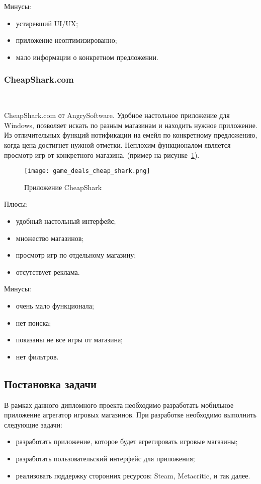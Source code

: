 Минусы:
\begin{itemize}
 \item устаревший UI/UX;
 \item приложение неоптимизированно;
 \item мало информации о конкретном предложении.
\end{itemize}

\subsubsection{CheapShark.com}~\par
CheapShark.com от AngrySoftware. Удобное настольное приложение для Windows, позволяет искать по разным магазинам и находить нужное приложение. Из отличительных функций нотификации на емейл по конкретному предложению, когда цена достигнет нужной отметки. Неплохим функционалом является просмотр игр от конкретного магазина. (пример на рисунке~\ref{fig:domain:game_cheap_shark}).

\begin{figure}[H]
  \centering
    \texttt{[image: game\_deals\_cheap\_shark.png]} 
    \caption{Приложение CheapShark}
    \label{fig:domain:game_cheap_shark}
 \end{figure}

Плюсы:
\begin{itemize}
  \item удобный настольный интерфейс;
  \item множество магазинов;
  \item просмотр игр по отдельному магазину;
  \item отсутствует реклама.
\end{itemize}

 Минусы:
 \begin{itemize}
  \item очень мало функционала;
  \item нет поиска;
  \item показаны не все игры от магазина;
  \item нет фильтров.
\end{itemize}
 
\subsection{Постановка задачи}
В рамках данного дипломного проекта необходимо разработать мобильное приложение агрегатор игровых магазинов. При разработке необходимо выполнить следующие задачи:
\begin{itemize}
 \item разработать приложение, которое будет агрегировать игровые магазины;
 \item разработать пользовательский интерфейс для приложения;
 \item реализовать поддержку сторонних ресурсов: Steam, Metacritic, и так далее.
\end{itemize}
 
